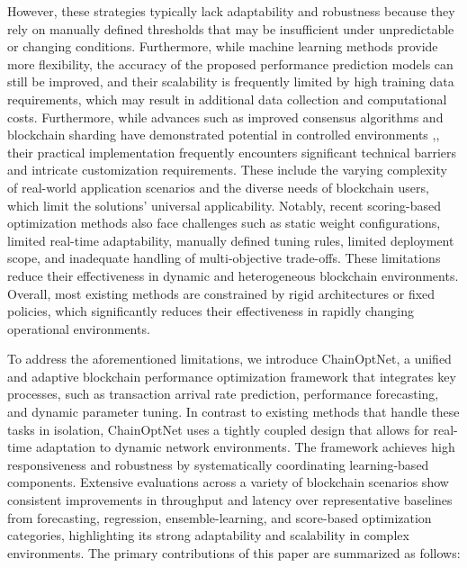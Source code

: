 \documentclass[a4paper,fleqn]{cas-dc}
\begin{document}
However, these strategies typically lack adaptability and robustness because they rely on manually defined thresholds that may be insufficient under unpredictable or changing conditions. Furthermore, while machine learning methods provide more flexibility, the accuracy of the proposed performance prediction models can still be improved, and their scalability is frequently limited by high training data requirements, which may result in additional data collection and computational costs. Furthermore, while advances such as improved consensus algorithms and blockchain sharding have demonstrated potential in controlled environments \citep{xu2023adaptchain},\citep{li2023lb}, their practical implementation frequently encounters significant technical barriers and intricate customization requirements. These include the varying complexity of real-world application scenarios and the diverse needs of blockchain users, which limit the solutions' universal applicability. Notably, recent scoring-based optimization methods \citep{wang2023learningchain} also face challenges such as static weight configurations, limited real-time adaptability, manually defined tuning rules, limited deployment scope, and inadequate handling of multi-objective trade-offs. These limitations reduce their effectiveness in dynamic and heterogeneous blockchain environments. Overall, most existing methods are constrained by rigid architectures or fixed policies, which significantly reduces their effectiveness in rapidly changing operational environments.



To address the aforementioned limitations, we introduce ChainOptNet, a unified and adaptive blockchain performance optimization framework that integrates key processes, such as transaction arrival rate prediction, performance forecasting, and dynamic parameter tuning. In contrast to existing methods that handle these tasks in isolation, ChainOptNet uses a tightly coupled design that allows for real-time adaptation to dynamic network environments. The framework achieves high responsiveness and robustness by systematically coordinating learning-based components. Extensive evaluations across a variety of blockchain scenarios show consistent improvements in throughput and latency over representative baselines from forecasting, regression, ensemble-learning, and score-based optimization categories, highlighting its strong adaptability and scalability in complex environments. The primary contributions of this paper are summarized as follows:
\end{document}
